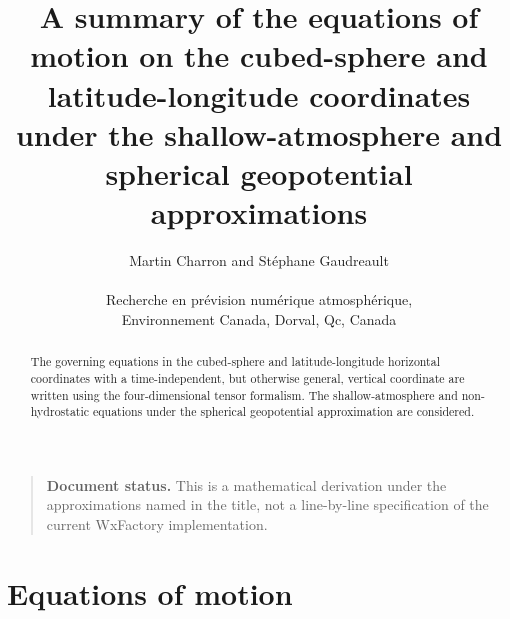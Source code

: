 \documentclass{article}
\begin{document}
\title{\bf A summary of the equations of motion on the cubed-sphere and latitude-longitude coordinates under the shallow-atmosphere and spherical geopotential approximations}

\author{Martin Charron and St\'ephane Gaudreault \\
\\ \vspace{6pt} Recherche en pr\'evision num\'erique atmosph\'erique, 
\\ Environnement Canada, Dorval, Qc, Canada}

\maketitle

\begin{quote}
\textbf{Document status.} This is a mathematical derivation under the approximations named in the
title, not a line-by-line specification of the current WxFactory implementation.
\end{quote}

\begin{abstract}
The governing equations in the cubed-sphere and latitude-longitude horizontal coordinates with a time-independent, but otherwise general, vertical coordinate are written using the four-dimensional tensor formalism. The shallow-atmosphere and non-hydrostatic equations under the spherical geopotential approximation are considered.
\end{abstract}

\section{Equations of motion}
\end{document}

